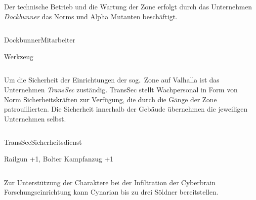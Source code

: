 
\begin{column}[l]{0.45}
    Der technische Betrieb und die Wartung der Zone erfolgt durch das Unternehmen \emph{Dockbunner} das Norms und Alpha Mutanten 
    beschäftigt.
\end{column}
\begin{column}[r]{0.45}
    \begin{nscsheet}[h]{Dockbunner\newline{}Mitarbeiter}
        \nscstats[]
        \nscruler
        \begin{nscinventory}
            \nscitem[Waffen] Werkzeug
        \end{nscinventory}
    \end{nscsheet}
\end{column}    


\begin{column}[l]{0.45}
    Um die Sicherheit der Einrichtungen der sog.~Zone auf Valhalla ist das Unternehmen \emph{TransSec} zuständig. TransSec stellt
    Wachpersonal in Form von Norm Sicherheitskräften zur Verfügung, die durch die Gänge der Zone patrouillierten. Die Sicherheit
    innerhalb der Gebäude übernehmen die jeweiligen Unternehmen selbst.
\end{column}
\begin{column}[r]{0.45}
    \begin{nscsheet}[h]{TransSec\newline{}Sicherheitsdienst}
        \nscstats[ATT=2,AGG=2]
        \nscruler
        \begin{nscinventory}
            \nscitem[Waffen] Railgun +1, Bolter
            \nscitem[Rüstung] Kampfanzug +1
        \end{nscinventory}
    \end{nscsheet}
\end{column}
\vfill

\pagebreak
{}

Zur Unterstützung der Charaktere bei der Infiltration der Cyberbrain Forschungseinrichtung kann Cynarian bis zu 
drei Söldner bereitstellen.

